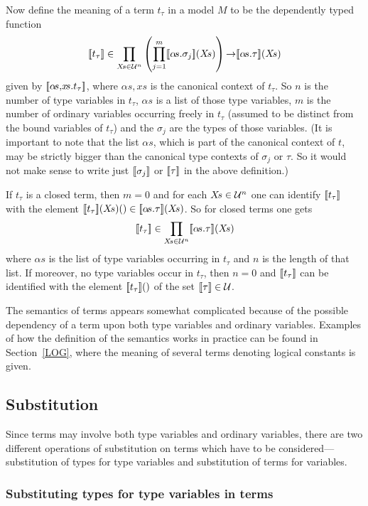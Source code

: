 Now define the meaning of a term $t_{\tau}$ in a model $M$ to be the
dependently typed function
\[ \den{t_{\tau}} \in \prod_{X\!s\in{\cal U}^{n}}
   \left(\prod_{j=1}^{m}\den{\alpha\!s.\sigma_{j}}(X\!s)\right)
   \fun \den{\alpha\!s.\tau}(X\!s)
\]
given by $[\![\alpha\!s,\!x\!s.t_{\tau}]\!]$, where $\alpha\!s,\!x\!s$ is the
canonical context of $t_{\tau}$. So $n$ is the number of type variables in
$t_{\tau}$, $\alpha\!s$ is a list of those type variables, $m$ is the
number of ordinary variables occurring freely in $t_{\tau}$ (assumed to be
distinct from the bound variables of $t_{\tau}$) and the $\sigma_{j}$ are
the types of those variables. (It is important to note that the list
$\alpha\!s$, which is part of the canonical context of $t$, may be strictly
bigger than the canonical type contexts of $\sigma_{j}$ or $\tau$. So it
would not make sense to write just $[\![\sigma_{j}]\!]$ or $[\![\tau]\!]$ in
the above definition.)

If $t_{\tau}$ is a closed term, then $m=0$ and for each $X\!s\in{\cal
U}^{n}$ one can identify $[\![t_{\tau}]\!]$ with the element
$[\![t_{\tau}]\!](X\!s)()\in[\![\alpha\!s.\tau]\!](X\!s)$. So for closed terms
one gets
\[ [\![t_{\tau}]\!] \in \prod_{X\!s\in{\cal U}^{n}}
[\![\alpha\!s.\tau]\!](X\!s)
\]
where $\alpha\!s$ is the list of type variables occurring in $t_{\tau}$ and
$n$ is the length of that list. If moreover, no type variables occur in
$t_{\tau}$, then $n=0$ and $[\![t_{\tau}]\!]$ can be identified with the
element $[\![t_{\tau}]\!]()$ of the set $[\![\tau]\!]\in{\cal U}$.

The semantics of terms appears somewhat complicated because of the
possible dependency of a term upon both type variables and ordinary
variables. Examples of how the definition of the semantics
works in practice can be found in Section~\ref{LOG}, where the meaning
of several terms denoting logical constants is given.

\subsection{Substitution}
\label{term-substitution}

Since terms may involve both type variables and
ordinary variables, there are two different operations of substitution
on terms which have to be considered---substitution of types for type
variables and substitution of terms for variables.

\subsubsection*{Substituting types for type variables in terms}

